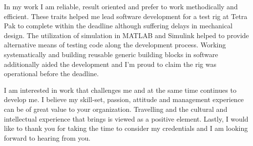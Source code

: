 \documentclass[12pt,a4paper,sans]{moderncv} %
\begin{document}

In my work I am reliable, result oriented and prefer to work methodically and efficient. 
These traits helped me lead software development for a test rig at Tetra Pak to complete within the deadline although suffering delays in mechanical design. 
The utilization of simulation in MATLAB and Simulink helped to provide alternative  means of testing code along the development process. 
Working systematically and building reusable generic building blocks in software additionally aided the development and I'm proud to claim the rig was operational before the deadline.


I am interested in work that challenges me and at the same time continues to develop me.
I believe my skill-set, passion, attitude and management experience can be of great value to your organization.
Travelling and the cultural and intellectual experience that brings is viewed as a positive element.
\newline
Lastly, I would like to thank you for taking the time to consider my credentials and I am looking forward to hearing from you.


\makeletterclosing %

\end{document}
